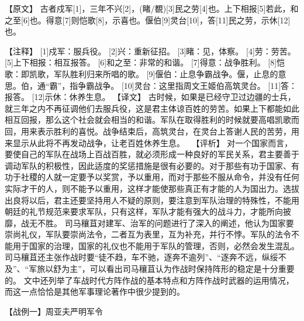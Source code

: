 \documentclass[a4paper,12pt,UTF8,twoside]{ctexbook}
\begin{document}
【原文】
古者戍军[1]，三年不兴[2]，(睹/覩)[3]民之劳[4]也。上下相报[5]若此，和之至[6]也。得意[7]则恺歌[8]，示喜也。偃伯[9]灵台[10]，答[11]民之劳，示休[12]也。

【注释】
[1]戍军：服兵役。
[2]兴：重新征招。
[3]睹：见，体察。
[4]劳：劳苦。
[5]上下相报：相互报答。
[6]和之至：非常的和谐。
[7]得意：战争胜利。
[8]恺歌：即凯歌，军队胜利归来所唱的歌。
[9]偃伯：止息争霸战争。偃，止息的意思。伯，通“霸”，指争霸战争。
[10]灵台：这里指周文王姬伯高筑灵台。
[11]答：报答。
[12]示休：休养生息。
【译文】
古时候，如果是已经守卫过边疆的士兵，就三年之内不再征调他们去服兵役，这是君主体谅百姓的劳苦。如果上下都能如此相互回报，那么这个社会就会相当的和谐。军队在取得胜利的时候就要高唱凯歌而回，用来表示胜利的喜悦。战争结束后，高筑灵台，在灵台上答谢人民的苦劳，用来显示从此将不再发动战争，让老百姓休养生息。
　【评析】
对一个国家而言，要使自己的军队在战场上百战百胜，就必须形成一种良好的军民关系，君主要善于调动军队的积极性，因此适度的奖惩措施是很有必要的。对于那些有功于国家、有功于社稷的人就一定要予以奖赏，予以重用，而对于那些不服从命令，并没有任何实际才干的人，则不能予以重用，这样才能使那些真正有才能的人为国出力。选拔出良将以后，君主还要坚持用人不疑的原则，要注意到军队治理的特殊性，不能用朝廷的礼节规范来要求军队，只有这样，军队才能有强大的战斗力，才能所向披靡，战无不胜。
司马穰苴对建军、治军的问题进行了深入的阐述，他认为国家要崇尚礼仪，军队要崇尚法令，二者互为表里，互为补充，并行不悖。军队的法令不能用于国家的治理，国家的礼仪也不能用于军队的管理，否则，必然会发生混乱。
司马穰苴还主张作战时要“徒不趋，车不驰，逐奔不逾列”、“逐奔不远，纵绥不及”、“军旅以舒为主”，可以看出司马穰苴认为作战时保持阵形的稳定是十分重要的。
文中还列举了车战时代方阵作战的基本特点和方阵作战时武器的运用情况，而这一点恰恰是其他军事理论著作中很少提到的。


【战例一】周亚夫严明军令
\end{document}
